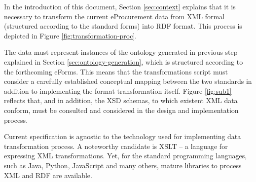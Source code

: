 	In the introduction of this document, Section \ref{sec:context} explains that it is necessary to transform the current eProcurement data from XML formal (structured according to the standard forms) into RDF format. This process is depicted in Figure \ref{fig:transformation-proc}.
	
	The data must represent instances of the ontology generated in previous step explained in Section \ref{sec:ontology-generation}, which is structured according to the forthcoming eForms. This means that the transformations script must consider a carefully established conceptual mapping between the two standards in addition to implementing the format transformation itself. Figure \ref{fig:sub1} reflects that, and in addition, the XSD schemas, to which existent XML data conform, must be consulted and considered in the design and implementation process. 
	
	Current specification is agnostic to the technology used for implementing data transformation process. A noteworthy candidate is XSLT -- a language for expressing XML transformations. Yet, for the standard programming languages, such as Java, Python, JavaScript and many others, mature libraries to process XML and RDF are available.
	
